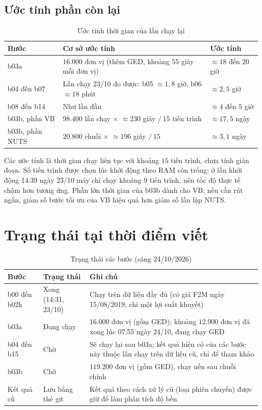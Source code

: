 \documentclass[12pt,a4paper]{article}
\theoremstyle{remark}
\begin{document}
\subsection{Ước tính phần còn lại}

\begin{table}[h]
\centering
\caption{Ước tính thời gian của lần chạy lại}\label{tab:uoctinh}
\begin{tabular}{@{}lp{7.2cm}p{3.6cm}@{}}
\toprule
\textbf{Bước} & \textbf{Cơ sở ước tính} & \textbf{Ước tính} \\
\midrule
b03a & $16.000$ đơn vị (thêm GED, khoảng $55$ giây mỗi đơn vị) & $\approx18$ đến $20$ giờ \\
b04 đến b07 & Lần chạy 23/10 đo được: b05 $\approx1{,}8$ giờ, b06 $\approx18$ phút & $\approx2{,}5$ giờ \\
b08 đến b14 & Như lần đầu & $\approx4$ đến $5$ giờ \\
b03b, phần VB & $98.400$ lần chạy $\times$ $\approx230$ giây $/\ 15$ tiến trình & $\approx17{,}5$ ngày \\
b03b, phần NUTS & $20.800$ chuỗi $\times$ $\approx196$ giây $/\ 15$ & $\approx3{,}1$ ngày \\
\bottomrule
\end{tabular}
\end{table}

Các ước tính là thời gian chạy liên tục với khoảng $15$ tiến trình, chưa tính gián đoạn. Số tiến trình được chọn lúc khởi động theo RAM còn trống; ở lần khởi động 14:39 ngày 23/10 máy chỉ chạy khoảng $9$ tiến trình, nên tốc độ thực tế chậm hơn tương ứng. Phần lớn thời gian của b03b dành cho VB; nếu cần rút ngắn, giảm số bước tối ưu của VB hiệu quả hơn giảm số lần lặp NUTS.

\section{Trạng thái tại thời điểm viết}\label{sec:trangthai}

\begin{table}[h]
\centering
\caption{Trạng thái các bước (sáng 24/10/2026)}\label{tab:trangthai}
\begin{tabular}{@{}lp{4.0cm}p{7.0cm}@{}}
\toprule
\textbf{Bước} & \textbf{Trạng thái} & \textbf{Ghi chú} \\
\midrule
b00 đến b02k & Xong (14:31, 23/10) & Chạy trên dữ liệu đầy đủ (có giá F2M ngày 15/08/2019, chỉ một lợi suất khuyết) \\
b03a & Đang chạy & $16.000$ đơn vị (gồm GED); khoảng $12.900$ đơn vị đã xong lúc 07:55 ngày 24/10, đang chạy GED \\
b04 đến b15 & Chờ & Sẽ chạy lại sau b03a; kết quả hiện có của các bước này thuộc lần chạy trên dữ liệu cũ, chỉ để tham khảo \\
b03b & Chờ & $119.200$ đơn vị (gồm GED), chạy nền sau chuỗi chính \\
Kết quả cũ & Lưu bằng thẻ git & Kết quả theo cách xử lý cũ (loại phiên chuyển) được giữ để làm phân tích độ bền \\
\bottomrule
\end{tabular}
\end{table}
\end{document}
